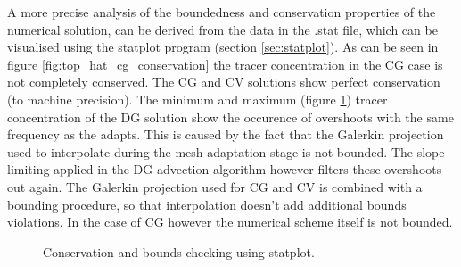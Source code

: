 A more precise analysis of the boundedness and conservation properties of the numerical solution, can be
derived from the data in the .stat file, which can be visualised using the statplot program 
(section \ref{sec:statplot}). As can be seen in figure \ref{fig:top_hat_cg_conservation} the tracer
concentration in the CG case is not completely conserved. 
The CG and CV solutions show perfect conservation (to machine precision). The minimum 
and maximum (figure \ref{fig:top_hat_dg_max}) tracer concentration of the
DG solution show the occurence of overshoots with the same frequency as the adapts. This is caused by the
fact that the Galerkin projection used to interpolate during the mesh adaptation stage is not 
bounded. The slope limiting applied in the DG advection algorithm however filters these overshoots 
out again. The Galerkin projection used for CG and CV is combined with a bounding procedure, so 
that interpolation doesn't add additional bounds violations. In the case of CG however the numerical 
scheme itself is not bounded.

\begin{figure}
  \centering
    \label{fig:top_hat_cg_conservation}
    \label{fig:top_hat_dg_max}
  \caption{Conservation and bounds checking using statplot.}
\end{figure}

